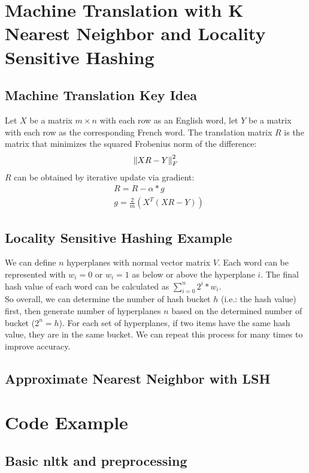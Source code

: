 \section{Machine Translation with K Nearest Neighbor and Locality Sensitive Hashing}

\subsection{Machine Translation Key Idea} 
Let $X$ be a matrix $m \times n$ with each row as an English word, let $Y$ be a matrix with each row as the corresponding French word. The translation matrix $R$ is the matrix that minimizes the squared Frobenius norm of the difference: 
    \begin{align*}
        \left\lVert XR - Y\right\rVert_F^2
    \end{align*}
$R$ can be obtained by iterative update via gradient:  
    \begin{align*}
        & R = R - \alpha * g \\
        & g = \frac{2}{m}(X^T(XR-Y))
    \end{align*}


\subsection{Locality Sensitive Hashing Example}
We can define $n$ hyperplanes with normal vector matrix $V$. Each word can be represented with $w_i = 0$ or $w_i = 1$ as below or above the hyperplane $i$. The final hash value of each word can be calculated as $\sum_{i=0}^n 2^i * w_i$. \\

So overall, we can determine the number of hash bucket $h$ (i.e.: the hash value) first, then generate number of hyperplanes $n$ based on the determined number of bucket ($2^n = h$). For each set of hyperplanes, if two items have the same hash value, they are in the same bucket. We can repeat this process for many times to improve accuracy. 

\subsection{Approximate Nearest Neighbor with LSH} 




\section{Code Example}
\subsection{Basic nltk and preprocessing} 

